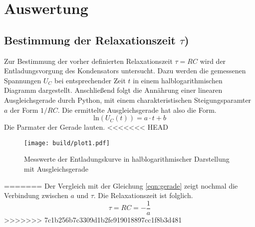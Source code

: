 \section{Auswertung}
\subsection{Bestimmung der Relaxationszeit $\tau$)}  %
Zur Bestimmung der vorher definierten Relaxationszeit $\tau = RC$ wird der Entladungsvorgung des Kondensators untersucht.
Dazu werden die gemessenen Spannungen $U_{C}$ bei entsprechender Zeit $t$ in einem halblogarithmischen Diagramm dargestellt.
Anschließend folgt die Annährung einer linearen Ausgleichsgerade durch Python, mit einem charakteristischen Steigungsparamter $a$
der Form $1/RC$. 
Die ermittelte Ausgleichsgerade hat also die Form.
\begin{equation}
    \text{ln}(U_{C}(t)) = a \cdot t + b
\end{equation}
Die Parmater der Gerade lauten.
<<<<<<< HEAD
 
\begin{figure}
    \centering 
    \texttt{[image: build/plot1.pdf]}
    \caption{Messwerte der Entladungskurve in halblogarithmischer Darstellung mit Ausgleichsgerade}
    \label{plt:plot1}
\end{figure} 
=======
Der Vergleich mit der Gleichung \eqref{eqn:gerade} zeigt nochmal die Verbindung zwischen $a$ und $\tau$. Die Relaxationszeit ist folglich.
\begin{equation}
\tau = RC = - \frac{1}{a}
\end{equation}
>>>>>>> 7c1b256b7c3309d1b2fe919018897cc1f8b3d481
